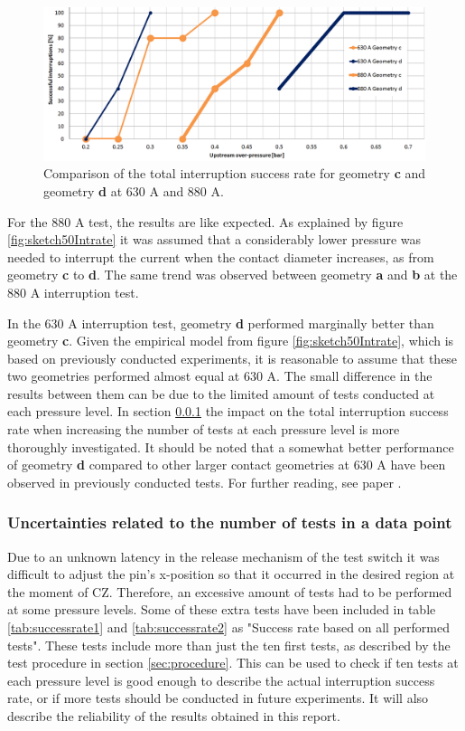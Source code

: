 \documentclass[10pt,b5paper,twoside]{article}
\begin{document}
\begin{figure}[H]
\centering
\includegraphics[scale=0.5, angle =90 ]{Bilder/Results/compGeoCandDNew.PNG}
\caption{Comparison of the total interruption success rate for geometry \textbf{c} and geometry \textbf{d} at 630 A and 880 A.} \label{fig:compgeoCandDAllcurrents}
\end{figure}

For the 880 A test, the results are like expected. As explained by figure \ref{fig:sketch50Intrate} it was assumed that a considerably lower pressure was needed to interrupt the current when the contact diameter increases, as from geometry \textbf{c} to \textbf{d}. The same trend was observed between geometry \textbf{a} and \textbf{b} at the 880 A interruption test.

In the 630 A interruption test, geometry \textbf{d} performed marginally better than geometry \textbf{c}. Given the empirical model from figure \ref{fig:sketch50Intrate}, which is based on previously conducted experiments, it is reasonable to assume that these two geometries performed almost equal at 630 A. The small difference in the results between them can be due to the limited amount of tests conducted at each pressure level. In section \ref{sec:impactOfTestNumber} the impact on the total interruption success rate when increasing the number of tests at each pressure level is more thoroughly investigated. It should be noted that a somewhat better performance of geometry \textbf{d} compared to other larger contact geometries at 630 A have been observed in previously conducted tests. For further reading, see paper \cite{bib:AFIMVLBA}.

\subsubsection{Uncertainties related to the number of tests in a data point} \label{sec:impactOfTestNumber}
Due to an unknown latency in the release mechanism of the test switch it was difficult to adjust the pin's x-position so that it occurred in the desired region at the moment of CZ. Therefore, an excessive amount of tests had to be performed at some pressure levels. Some of these extra tests have been included in table \ref{tab:successrate1} and \ref{tab:successrate2} as "Success rate based on all performed tests". These tests include more than just the ten first tests, as described by the test procedure in section \ref{sec:procedure}. This can be used to check if ten tests at each pressure level is good enough to describe the actual interruption success rate, or if more tests should be conducted in future experiments. It will also describe the reliability of the results obtained in this report.
\end{document}
